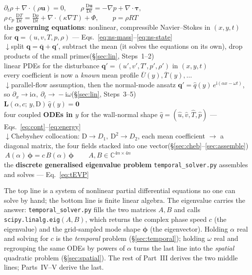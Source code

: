 \documentclass[11pt]{article}
\newcommand{\D}{\mathrm{D}}
\newcommand{\imag}{\mathrm{i}}
\renewcommand{\bar}[1]{\overline{#1}}
\newcommand{\hatu}{\hat{u}}
\newcommand{\hatv}{\hat{v}}
\newcommand{\hatT}{\hat{T}}
\newcommand{\hatp}{\hat{p}}
\newcommand{\hatq}{\hat{q}}
\begin{document}
\begin{center}\small
$\partial_t\rho+\nabla\!\cdot(\rho\mathbf u)=0,\qquad \rho\,\tfrac{\D\mathbf u}{\D t}=-\nabla p+\nabla\!\cdot\boldsymbol\tau,$\\[1pt]
$\rho\,c_p\,\tfrac{\D T}{\D t}=\tfrac{\D p}{\D t}+\nabla\!\cdot(\kappa\nabla T)+\Phi,\qquad p=\rho R T$\\[2pt]
{\footnotesize the \textbf{governing equations}: nonlinear, compressible Navier--Stokes in $(x,y,t)$ for $\mathbf q=(u,v,T,p,\rho)$ --- Eqs.~\eqref{eq:ns-mass}--\eqref{eq:ns-state}}\\[6pt]
{\footnotesize$\downarrow$\quad split $\mathbf q=\bar{\mathbf q}+\mathbf q'$, subtract the mean (it solves the equations on its own), drop products of the small primes\quad(\S\ref{sec:lin}, Steps~1--2)}\\[6pt]
linear PDEs for the disturbance $\mathbf q'=(u',v',T',p',\rho')$ in $(x,y,t)$\\[1pt]
{\footnotesize every coefficient is now a \emph{known} mean profile $\bar U(y),\bar T(y),\dots$}\\[6pt]
{\footnotesize$\downarrow$\quad parallel-flow assumption, then the normal-mode ansatz $\mathbf q'=\hatq(y)\,e^{\imag(\alpha x-\omega t)}$, so $\partial_x\!\to\!\imag\alpha,\ \partial_t\!\to\!-\imag\omega$\quad(\S\ref{sec:lin}, Steps~3--5)}\\[6pt]
$\mathbf L(\alpha,c;\,y,\D)\,\hatq(y)=\mathbf 0$\\[1pt]
{\footnotesize four coupled \textbf{ODEs in $y$} for the wall-normal shape $\hatq=(\hatu,\hatv,\hatT,\hatp)$ --- Eqs.~\eqref{eq:cont}--\eqref{eq:energy}}\\[6pt]
{\footnotesize$\downarrow$\quad Chebyshev collocation: $\D\!\to\!D_1,\ \D^2\!\to\!D_2$, each mean coefficient $\to$ a diagonal matrix, the four fields stacked into one vector\quad(\S\ref{sec:cheb}--\ref{sec:assemble})}\\[6pt]
$\boxed{\,A(\alpha)\,\boldsymbol\phi=c\,B(\alpha)\,\boldsymbol\phi\,}\qquad A,B\in\mathbb C^{4n\times4n}$\\[1pt]
{\footnotesize the \textbf{discrete generalised eigenvalue problem} \texttt{temporal\_solver.py} assembles and solves --- Eq.~\eqref{eq:tEVP}}
\end{center}

\noindent The top line is a system of nonlinear partial differential equations no one can solve by hand;
the bottom line is finite linear algebra. The eigenvalue carries the answer: \texttt{temporal\_solver.py}
fills the two matrices $A,B$ and calls \texttt{scipy.linalg.eig}$(A,B)$, which returns the complex phase
speed $c$ (the eigenvalue) and the grid-sampled mode shape $\boldsymbol\phi$ (the eigenvector). Holding
$\alpha$ real and solving for $c$ is the \emph{temporal} problem (\S\ref{sec:temporal}); holding $\omega$
real and regrouping the same ODEs by powers of $\alpha$ turns the last line into the \emph{spatial}
quadratic problem (\S\ref{sec:spatial}). The rest of Part~III derives the two middle lines; Parts~IV--V
derive the last.
\end{document}
